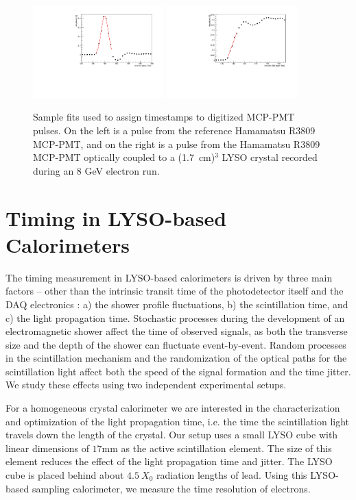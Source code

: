 \begin{figure}[h] \centering
\includegraphics[width=0.45\textwidth]{figs/Reference_Pulse_GausFit_057_ev322.pdf} 
\includegraphics[width=0.45\textwidth]{figs/LYSOCube_Pulse_RisingEdgeFit_057_ev313.pdf} 
\caption{\small Sample fits used to assign timestamps to digitized MCP-PMT pulses. 
On the left is a pulse from the reference Hamamatsu R3809 MCP-PMT, and
on the right is a pulse from the Hamamatsu R3809 MCP-PMT
optically coupled to a (1.7~cm)$^{3}$  LYSO crystal
recorded during an 8 GeV electron run.}
\label{fig:PulseFits}
\end{figure}


\section{Timing in LYSO-based Calorimeters}
The timing measurement in 
LYSO-based calorimeters is driven by three main factors  -- other  than the intrinsic transit 
time of the photodetector itself and the DAQ electronics : a) the shower profile fluctuations,  
b) the scintillation time, and c) the light propagation time. Stochastic processes during the
development of an electromagnetic shower affect the time of observed signals, as
both the transverse size and the depth of the shower can fluctuate event-by-event. 
Random processes in the scintillation mechanism and the randomization of
the optical paths for the scintillation light affect both the speed of the
signal formation and the time jitter. We study these effects using two
independent experimental setups. 

For a  homogeneous crystal calorimeter we are interested in the characterization and 
optimization of the light propagation time, i.e. the time the scintillation light travels
down the length of the crystal. Our setup uses a small LYSO cube with linear dimensions 
of $17\mathrm{mm}$ as the active scintillation element. The size of this element reduces 
the effect of the light propagation time and jitter. The LYSO cube is placed behind about 
$4.5~X_0$ radiation lengths of lead. Using this LYSO-based sampling calorimeter, we
measure the time resolution of electrons.

